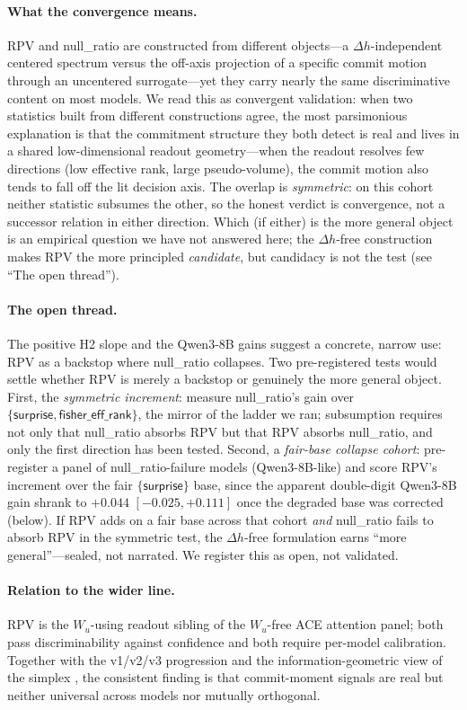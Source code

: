 \documentclass[10pt, letterpaper]{article}
\newcommand{\Wu}{W_{u}}
\newcommand{\effrank}{\textsf{fisher\_eff\_rank}}
\newcommand{\nullr}{\textsf{null\_ratio}}
\begin{document}
\paragraph{What the convergence means.}
RPV and \nullr{} are constructed from different objects---a
$\Delta h$-independent centered spectrum versus the off-axis projection
of a specific commit motion through an uncentered surrogate---yet they
carry nearly the same discriminative content on most models. We read
this as convergent validation: when two statistics built from different
constructions agree, the most parsimonious explanation is that the
commitment structure they both detect is real and lives in a shared
low-dimensional readout geometry---when the readout resolves few
directions (low effective rank, large pseudo-volume), the commit motion
also tends to fall off the lit decision axis. The overlap is
\emph{symmetric}: on this cohort neither statistic subsumes the other,
so the honest verdict is convergence, not a successor relation in either
direction. Which (if either) is the more general object is an empirical
question we have not answered here; the $\Delta h$-free construction
makes RPV the more principled \emph{candidate}, but candidacy is not the
test (see ``The open thread'').

\paragraph{The open thread.}
The positive H2 slope and the Qwen3-8B gains suggest a concrete, narrow
use: RPV as a backstop where \nullr{} collapses. Two pre-registered
tests would settle whether RPV is merely a backstop or genuinely the
more general object. First, the \emph{symmetric increment}: measure
\nullr{}'s gain over $\{\textsf{surprise},\effrank{}\}$, the mirror of
the ladder we ran; subsumption requires not only that \nullr{} absorbs
RPV but that RPV absorbs \nullr{}, and only the first direction has been
tested. Second, a \emph{fair-base collapse cohort}: pre-register a panel
of \nullr{}-failure models (Qwen3-8B-like) and score RPV's increment
over the fair $\{\textsf{surprise}\}$ base, since the apparent
double-digit Qwen3-8B gain shrank to $+0.044$ $[-0.025,+0.111]$ once the
degraded base was corrected (below). If RPV adds on a fair base across
that cohort \emph{and} \nullr{} fails to absorb RPV in the symmetric
test, the $\Delta h$-free formulation earns ``more general''---sealed,
not narrated. We register this as open, not validated.

\paragraph{Relation to the wider line.}
RPV is the $\Wu$-using readout sibling of the $\Wu$-free ACE attention
panel; both pass discriminability against confidence and both require
per-model calibration. Together with the v1/v2/v3 progression
\citep{kitti2026pri} and the
information-geometric view of the simplex \citep{amari2016information},
the consistent finding is that commit-moment signals are real but
neither universal across models nor mutually orthogonal.
\end{document}
